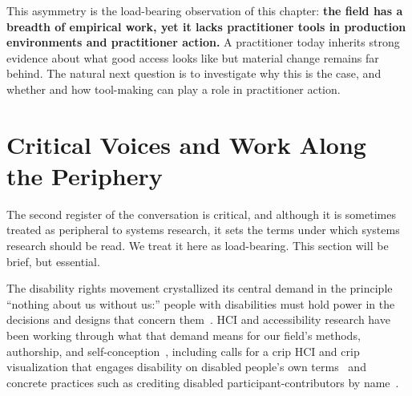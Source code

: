 \documentclass[12pt]{cmuthesis}
\begin{document}
 
This asymmetry is the load-bearing observation of this chapter: \textbf{the field has a breadth of empirical work, yet it lacks practitioner tools in production environments and practitioner action.} A practitioner today inherits strong evidence about what good access looks like but material change remains far behind. The natural next question is to investigate why this is the case, and whether and how tool-making can play a role in practitioner action.
 
\section{Critical Voices and Work Along the Periphery}
 
The second register of the conversation is critical, and although it is sometimes treated as peripheral to systems research, it sets the terms under which systems research should be read. We treat it here as load-bearing. This section will be brief, but essential.
 
The disability rights movement crystallized its central demand in the principle ``nothing about us without us:'' people with disabilities must hold power in the decisions and designs that concern them~\cite{Charlton1998Nothing}. HCI and accessibility research have been working through what that demand means for our field's methods, authorship, and self-conception~\cite{Spiel2020, Hofmann2020, Sum2022, Sum2024}, including calls for a crip HCI and crip visualization that engages disability on disabled people's own terms~\cite{Williams2021, Hsueh} and concrete practices such as crediting disabled participant-contributors by name~\cite{Zong2025}.
 
\end{document}
